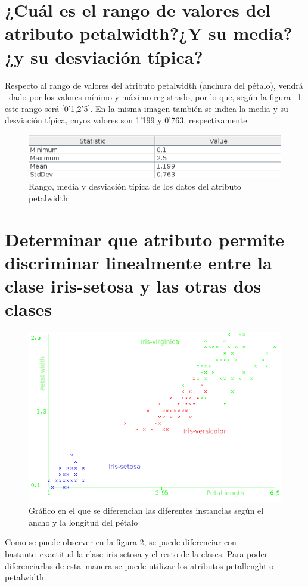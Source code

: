 \documentclass[11pt,twoside,a4paper]{book}
\begin{document}
\section{¿Cuál es el rango de valores del atributo petalwidth?¿Y su media? ¿y su desviación típica?}
Respecto al rango de valores del atributo petalwidth (anchura del pétalo), vendrá \
dado por los valores mínimo y máximo registrado, por lo que, según la figura \
\ref{Fig2} este rango será [0'1,2'5]. En la misma imagen también se indica la media y su desviación típica, cuyos valores son  1'199 y 0'763, respectivamente.
\begin{figure}[H]
	\includegraphics[width=\textwidth]{petalwidth.png}
	\caption{Rango, media y desviación típica de los datos del atributo petalwidth}
	\label{Fig2}
\end{figure}

\section{Determinar que atributo permite discriminar linealmente entre la clase iris-setosa y las otras dos clases}
\begin{figure}[H]
	\includegraphics[width=\textwidth]{Plot.png}
	\caption{Gráfico en el que se diferencian las diferentes instancias según el ancho y la longitud del pétalo}
	\label{Fig3}
\end{figure}
Como se puede observer en la figura \ref{Fig3}, se puede diferenciar con bastante\
exactitud la clase iris-setosa y el resto de la clases. Para poder diferenciarlas de esta\
manera se puede utilizar los atributos petallenght o petalwidth.
\end{document}
